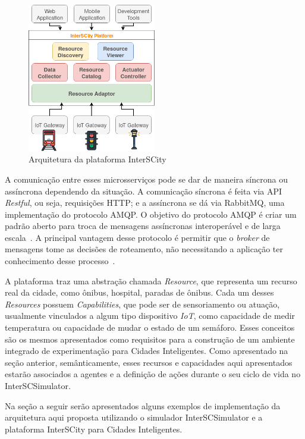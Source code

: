 \begin{figure}[ht]
	\centering
	\includegraphics[width=0.5\textwidth]{figuras/platform_architecture.png}
	\caption{Arquitetura da plataforma InterSCity}
	\label{fig:platform_architecture}
\end{figure}

A comunicação entre esses microsserviços pode se dar de maneira síncrona ou assíncrona dependendo da situação.
A comunicação síncrona é feita via API \textit{Restful}, ou seja, requisições HTTP; e a assíncrona se dá via RabbitMQ, uma implementação do protocolo AMQP.
O objetivo do protocolo AMQP é criar um padrão aberto para troca de mensagens assíncronas interoperável e de larga escala~\cite{vinoski_2006}.
A principal vantagem desse protocolo é permitir que o \textit{broker} de mensagens tome as decisões de roteamento, não necessitando a aplicação ter conhecimento
desse processo~\cite{vinoski_2006}.

A plataforma traz uma abstração chamada \textit{Resource}, que representa um recurso real da cidade, como ônibus, hospital, paradas de ônibus.
Cada um desses \textit{Resources} possuem \textit{Capabilities}, que pode ser de sensoriamento ou atuação, usualmente vinculados a algum tipo dispositivo \textit{IoT},
como capacidade de medir temperatura ou capacidade de mudar o estado de um semáforo.
Esses conceitos são os mesmos apresentados como requisitos para a construção de um ambiente integrado de experimentação para Cidades Inteligentes.
Como apresentado na seção anterior, semânticamente, esses recursos e capacidades aqui apresentados estarão associados a agentes e a definição de ações durante o seu
ciclo de vida no InterSCSimulator.

Na seção a seguir serão apresentados alguns exemplos de implementação da arquitetura aqui proposta utilizando o simulador InterSCSimulator e a plataforma InterSCity
para Cidades Inteligentes.

